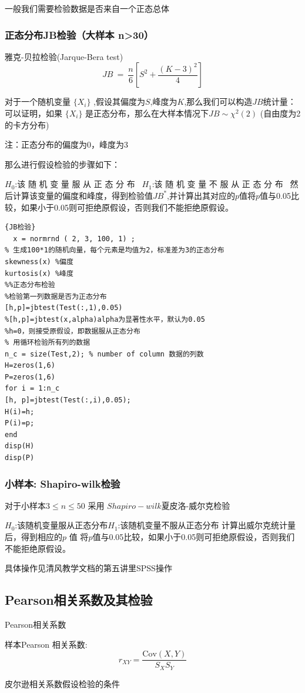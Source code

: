 \documentclass[12pt]{ctexart}
\numberwithin{equation}{section} %
\begin{document}
一般我们需要检验数据是否来自一个正态总体
\subsubsection{正态分布JB检验（大样本 n>30）}
雅克-贝拉检验(Jarque-Bera test)
$$JB\:=\:\dfrac{n}{6}[S^2+\dfrac{(K-3)^2}{4}]$$

对于一个随机变量 $\{X_i\}$ ,假设其偏度为$S$,峰度为$K$,那么我们可以构造$JB$统计量：
可以证明，如果 $\{X_i\}$ 是正态分布，那么在大样本情况下$JB\sim \chi ^2( 2)$ (自由度为2的卡方分布)

注：正态分布的偏度为0，峰度为3


那么进行假设检验的步骤如下：

$H_0{: \text{该 随 机 变 量 服 从 正 态 分 布 }}$ $H_1{: \text{该 随 机 变 量 不 服 从 正 态 分 布 }}$
然后计算该变量的偏度和峰度，得到检验值$JB^*$,并计算出其对应的$p$值将$p$值与0.05比较，如果小于0.05则可拒绝原假设，否则我们不能拒绝原假设。
\begin{lstlisting}{JB检验}
  x = normrnd ( 2, 3, 100, 1) ; 
% 生成100*1的随机向量，每个元素是均值为2，标准差为3的正态分布
skewness(x) %偏度
kurtosis(x) %峰度
%%正态分布检验
%检验第一列数据是否为正态分布
[h,p]=jbtest(Test(:,1),0.05)
%[h,p]=jbtest(x,alpha)alpha为显著性水平，默认为0.05
%h=0，则接受原假设，即数据服从正态分布
% 用循环检验所有列的数据
n_c = size(Test,2); % number of column 数据的列数
H=zeros(1,6)
P=zeros(1,6)
for i = 1:n_c
[h, p]=jbtest(Test(:,i),0.05);
H(i)=h;
P(i)=p;
end
disp(H)
disp(P)
\end{lstlisting}
\subsubsection{小样本: Shapiro-wilk检验}
对于小样本$3\leqslant n\leqslant50$
采用
$Shapiro-wilk$夏皮洛-威尔克检验

$H_0$:该随机变量服从正态分布$H_1$:该随机变量不服从正态分布
计算出威尔克统计量后，得到相应的$p$ 值
将$p$值与0.05比较，如果小于0.05则可拒绝原假设，否则我们不能拒绝原假设。

具体操作见清风教学文档的第五讲里SPSS操作
\subsection{Pearson相关系数及其检验}
\begin{mydef}{Pearson相关系数}
  

样本Pearson 相关系数:$$r_{XY}=\frac{\mathrm{Cov}(X,Y)}{S_XS_Y}$$
\end{mydef}
皮尔逊相关系数假设检验的条件
\end{document}
